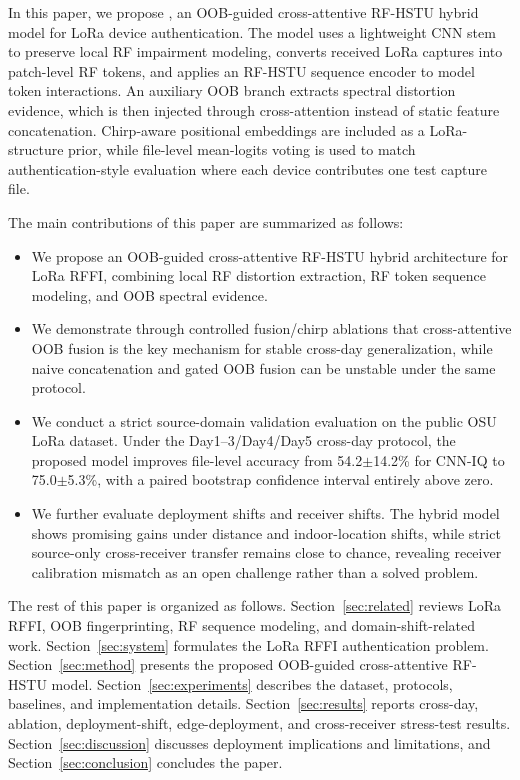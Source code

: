 In this paper, we propose \model, an OOB-guided cross-attentive RF-HSTU hybrid model for LoRa device authentication.
The model uses a lightweight CNN stem to preserve local RF impairment modeling, converts received LoRa captures into patch-level RF tokens, and applies an RF-HSTU sequence encoder to model token interactions.
An auxiliary OOB branch extracts spectral distortion evidence, which is then injected through cross-attention instead of static feature concatenation.
Chirp-aware positional embeddings are included as a LoRa-structure prior, while file-level mean-logits voting is used to match authentication-style evaluation where each device contributes one test capture file.

The main contributions of this paper are summarized as follows:
\begin{itemize}
  \item We propose an OOB-guided cross-attentive RF-HSTU hybrid architecture for LoRa RFFI, combining local RF distortion extraction, RF token sequence modeling, and OOB spectral evidence.
  \item We demonstrate through controlled fusion/chirp ablations that cross-attentive OOB fusion is the key mechanism for stable cross-day generalization, while naive concatenation and gated OOB fusion can be unstable under the same protocol.
  \item We conduct a strict source-domain validation evaluation on the public OSU LoRa dataset.
        Under the Day1--3/Day4/Day5 cross-day protocol, the proposed model improves file-level accuracy from 54.2$\pm$14.2\% for CNN-IQ to 75.0$\pm$5.3\%, with a paired bootstrap confidence interval entirely above zero.
  \item We further evaluate deployment shifts and receiver shifts.
        The hybrid model shows promising gains under distance and indoor-location shifts, while strict source-only cross-receiver transfer remains close to chance, revealing receiver calibration mismatch as an open challenge rather than a solved problem.
\end{itemize}

The rest of this paper is organized as follows.
Section~\ref{sec:related} reviews LoRa RFFI, OOB fingerprinting, RF sequence modeling, and domain-shift-related work.
Section~\ref{sec:system} formulates the LoRa RFFI authentication problem.
Section~\ref{sec:method} presents the proposed OOB-guided cross-attentive RF-HSTU model.
Section~\ref{sec:experiments} describes the dataset, protocols, baselines, and implementation details.
Section~\ref{sec:results} reports cross-day, ablation, deployment-shift, edge-deployment, and cross-receiver stress-test results.
Section~\ref{sec:discussion} discusses deployment implications and limitations, and Section~\ref{sec:conclusion} concludes the paper.
